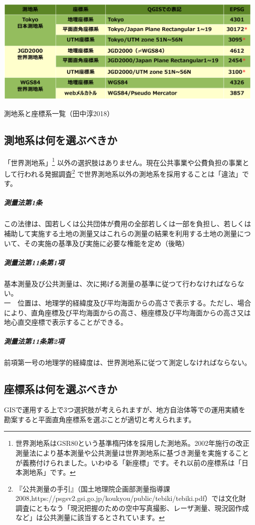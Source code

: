 \documentclass[14Q,twocolumn]{jsarticle}
\makeatletter
\newenvironment{figurehere}
  {\def\@captype{figure}}
  {}
\makeatother
\begin{document}
\begin{figurehere}
\centering
\includegraphics[width=1\linewidth]{sokuti01.png}
\caption{測地系と座標系一覧（田中淳2018）}
\end{figurehere}

\subsection{測地系は何を選ぶべきか}
「世界測地系」\footnote{
世界測地系はGSR80という基準楕円体を採用した測地系。2002年施行の改正測量法により基本測量や公共測量は世界測地系に基づき測量を実施することが義務付けられました。いわゆる「新座標」です。それ以前の座標系は「日本測地系」です。
}
以外の選択肢はありません。現在公共事業や公費負担の事業として行われる発掘調査\footnote{
『公共測量の手引』（国土地理院企画部測量指導課2008,https://psgsv2.gsi.go.jp/koukyou/public/tebiki/tebiki.pdf）では文化財調査にともなう「現況把握のための空中写真撮影、レーザ測量、現況図作成など」は公共測量に該当するとされています。
}
で世界測地系以外の測地系を採用することは「違法」です。

\subparagraph{測量法第1条}
この法律は、国若しくは公共団体が費用の全部若しくは一部を負担し、若しくは補助して実施する土地の測量又はこれらの測量の結果を利用する土地の測量について、その実施の基準及び実施に必要な権能を定め（後略）

\subparagraph{測量法第11条第1項}
基本測量及び公共測量は、次に掲げる測量の基準に従つて行わなければならない。\\
一　位置は、地理学的経緯度及び平均海面からの高さで表示する。ただし、場合により、直角座標及び平均海面からの高さ、極座標及び平均海面からの高さ又は地心直交座標で表示することができる。

\subparagraph{測量法第11条第2項}
前項第一号の地理学的経緯度は、世界測地系に従つて測定しなければならない。

\subsection{座標系は何を選ぶべきか}
GISで運用する上で3つ選択肢が考えられますが、地方自治体等での運用実績を勘案すると平面直角座標系を選ぶことが適切と考えられます。
\end{document}
